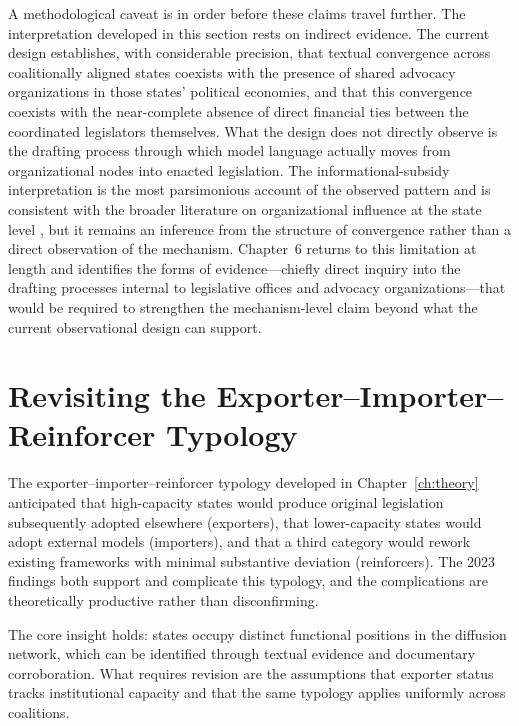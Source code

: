 A methodological caveat is in order before these claims travel further. The interpretation developed in this section rests on indirect evidence. The current design establishes, with considerable precision, that textual convergence across coalitionally aligned states coexists with the presence of shared advocacy organizations in those states' political economies, and that this convergence coexists with the near-complete absence of direct financial ties between the coordinated legislators themselves. What the design does not directly observe is the drafting process through which model language actually moves from organizational nodes into enacted legislation. The informational-subsidy interpretation is the most parsimonious account of the observed pattern and is consistent with the broader literature on organizational influence at the state level \parencite{hertel-fernandezStateCapture2019,hallLobbyingLegislativeSubsidy2006a}, but it remains an inference from the structure of convergence rather than a direct observation of the mechanism. Chapter~6 returns to this limitation at length and identifies the forms of evidence---chiefly direct inquiry into the drafting processes internal to legislative offices and advocacy organizations---that would be required to strengthen the mechanism-level claim beyond what the current observational design can support.
 
\section{Revisiting the Exporter--Importer--Reinforcer Typology}
\label{sec:exporter-importer-reinforcer}
 
The exporter--importer--reinforcer typology developed in Chapter~\ref{ch:theory} anticipated that high-capacity states would produce original legislation subsequently adopted elsewhere (exporters), that lower-capacity states would adopt external models (importers), and that a third category would rework existing frameworks with minimal substantive deviation (reinforcers). The 2023 findings both support and complicate this typology, and the complications are theoretically productive rather than disconfirming.
 
The core insight holds: states occupy distinct functional positions in the diffusion network, which can be identified through textual evidence and documentary corroboration. What requires revision are the assumptions that exporter status tracks institutional capacity and that the same typology applies uniformly across coalitions.
 
